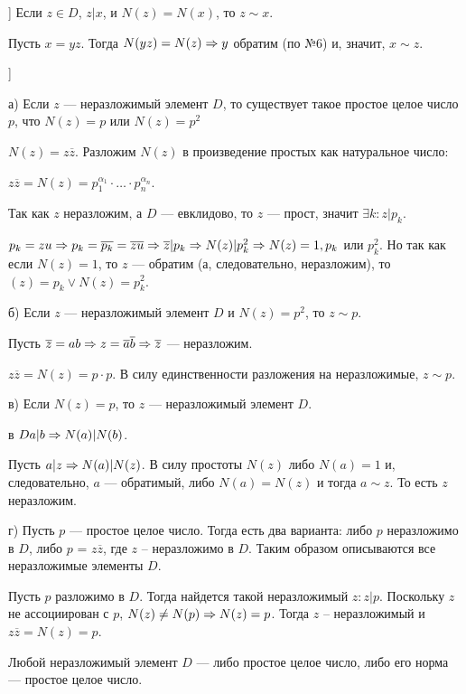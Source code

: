 \begin{problem}[10 (2.7) [Каргальцев]]
Если $z \in D$, $z | x$, и $N(z) = N(x)$, то $z \sim x$.
\end{problem}

\begin{solution}
Пусть \(x = yz\). Тогда \(N(yz) = N(z) \Rightarrow y\) обратим (по №6) и, значит, \(x \sim z\).
\end{solution}

\begin{problem}[?? [Каргальцев]]
\end{problem}

\begin{solution}
а) Если \(z\) --- неразложимый элемент \(D\), то существует такое простое целое число \(p\), что \(N(z) = p\) или \(N(z) = p^2\)

\(N(z) = z\overline{z}\). Разложим \(N(z)\) в произведение простых как натуральное число:

\(z\overline{z} = N(z) = p_1^{\alpha_1} \cdot \ldots \cdot p_n^{\alpha_n}\).

Так как \(z\) неразложим, а \(D\) --- евклидово, то \(z\) --- прост, значит \(\exists k: z | p_k\).

\(p_k = zu \Rightarrow p_k = \overline{p_k} = \overline{z}\overline{u} \Rightarrow \overline{z} | p_k \Rightarrow N(z) | p_k^2 \Rightarrow N(z) = 1, p_k\) или \(p_k^2\). Но так как если \(N(z) = 1\), то \(z\) --- обратим (а, следовательно, неразложим), то \((z) = p_k \lor N(z) = p_k^2\).

б) Если \(z\) --- неразложимый элемент \(D\) и \(N(z) = p^2\), то \(z \sim p\).

Пусть \(\overline{z} = ab \Rightarrow z = \overline{a} \overline{b} \Rightarrow \overline{z}\) --- неразложим.

\(z \overline{z} = N(z) = p \cdot p\). В силу единственности разложения на неразложимые, \(z \sim p\).

в) Если \(N(z) = p\), то \(z\) --- неразложимый элемент \(D\).

в \(D a|b \Rightarrow N(a) | N(b)\).

Пусть \(a | z \Rightarrow N(a) | N(z)\). В силу простоты \(N(z)\) либо \(N(a) = 1\) и, следовательно, \(a\) --- обратимый, либо \(N(a) = N(z)\) и тогда \(a \sim z\). То есть \(z\) неразложим.

г) Пусть \(p\) --- простое целое число. Тогда есть два варианта: либо \(p\) неразложимо в \(D\), либо \(p\) = \(z\overline{z}\), где \(z\) -- неразложимо в \(D\). Таким образом описываются все неразложимые элементы \(D\).

Пусть \(p\) разложимо в \(D\). Тогда найдется такой неразложимый \(z: z|p\). Поскольку \(z\) не ассоциирован с \(p\), \(N(z) \ne N(p) \Rightarrow N(z) = p\). Тогда \(z\) -- неразложимый и \(z\overline{z} = N(z) = p\).

Любой неразложимый элемент \(D\) --- либо простое целое число, либо его норма --- простое целое число.
\end{solution}

